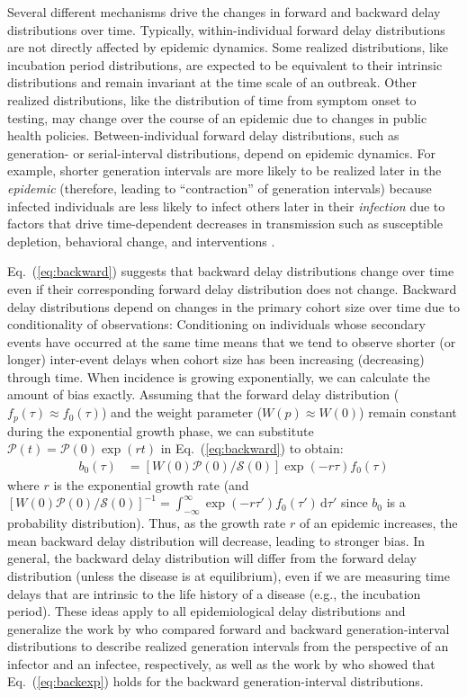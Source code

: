 \documentclass[12pt]{article}
\newcommand{\eref}[1]{Eq.~(\ref{eq:#1})}
\newcommand{\dd}[1]{\ensuremath{\, \mathrm{d}#1}}
\newcommand{\dtau}{\dd{\tau}}
\newcommand{\psymp}{\ensuremath{p}} %
\newcommand{\psize}{{\mathcal P}} %
\newcommand{\ssize}{{\mathcal S}} %
\begin{document}
Several different mechanisms drive the changes in forward and backward delay distributions over time.
Typically, within-individual forward delay distributions are not directly affected by epidemic dynamics.
Some realized distributions, like incubation period distributions, are expected to be equivalent to their intrinsic distributions and remain invariant at the time scale of an outbreak.
Other realized distributions, like the distribution of time from symptom onset to testing, may change over the course of an epidemic due to changes in public health policies.
Between-individual forward delay distributions, such as generation- or serial-interval distributions, depend on epidemic dynamics.
For example, shorter generation intervals are more likely to be realized later in the \emph{epidemic} (therefore, leading to ``contraction'' of generation intervals) because infected individuals are less likely to infect others later in their \emph{infection} due to factors that drive time-dependent decreases in transmission such as susceptible depletion, behavioral change, and interventions \citep{champredon2015intrinsic}.

\eref{backward} suggests that backward delay distributions change over time even if their corresponding forward delay distribution does not change.
Backward delay distributions depend on changes in the primary cohort size over time due to conditionality of observations:
Conditioning on individuals whose secondary events have occurred at the same time means that we tend to observe shorter (or longer) inter-event delays when cohort size has been increasing (decreasing) through time.
When incidence is growing exponentially, we can calculate the amount of bias exactly.
Assuming that the forward delay distribution ($f_\psymp(\tau) \approx f_0(\tau)$) and the weight parameter ($W(\psymp) \approx W(0)$) remain constant during the exponential growth phase, we can substitute $\psize(t) = \psize(0) \exp(rt)$ in \eref{backward} to obtain:
\begin{align}
b_0(\tau) &= \left[ W(0) \psize(0)/\ssize(0)\right] \exp(-r\tau) f_0(\tau)
\label{eq:backexp}
\end{align}
where $r$ is the exponential growth rate (and $\left[W(0) \psize(0)/\ssize(0)\right]^{-1} = \int_{-\infty}^{\infty} \exp(-r\tau') f_0(\tau') \dtau'$ since $b_0$ is a probability distribution).
Thus, as the growth rate $r$ of an epidemic increases, the mean backward delay distribution will decrease, leading to stronger bias.
In general, the backward delay distribution will differ from the forward delay distribution (unless the disease is at equilibrium), even if we are measuring time delays that are intrinsic to the life history of a disease (e.g., the incubation period).
These ideas apply to all epidemiological delay distributions and generalize the work by \cite{champredon2015intrinsic} who compared forward and backward generation-interval distributions to describe realized generation intervals from the perspective of an infector and an infectee, respectively, as well as the work by \cite{britton2019estimation} who showed that \eref{backexp} holds for the backward generation-interval distributions.
\end{document}
